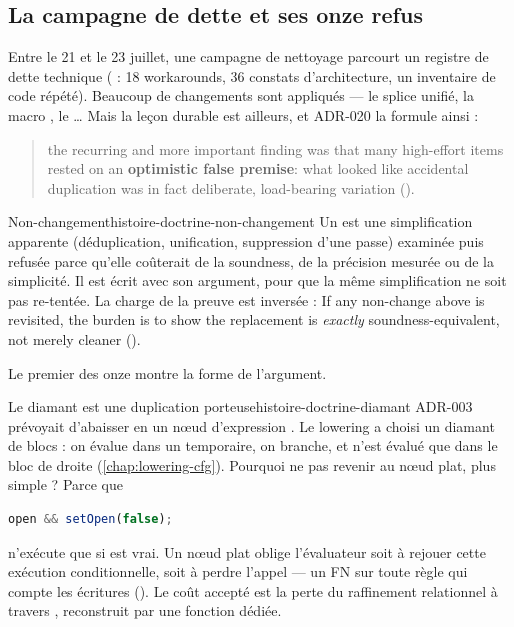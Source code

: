\subsection{La campagne de dette et ses onze refus}

Entre le 21 et le 23 juillet, une campagne de nettoyage parcourt un registre de dette technique ( : 18 workarounds, 36 constats d'architecture, un inventaire de code répété). Beaucoup de changements sont appliqués --- le splice unifié, la macro , le \dots{} Mais la leçon durable est ailleurs, et ADR-020 la formule ainsi :

\begin{quote}\small
\og the recurring and more important finding was that many high-effort items rested on an \textbf{optimistic false premise}: what looked like accidental duplication was in fact deliberate, load-bearing variation\fg{} ().
\end{quote}

\begin{definition}{Non-changement}{histoire-doctrine-non-changement}
Un  est une simplification apparente (déduplication, unification, suppression d'une passe) examinée puis refusée parce qu'elle coûterait de la soundness, de la précision mesurée ou de la simplicité. Il est écrit avec son argument, pour que la même simplification ne soit pas re-tentée. La charge de la preuve est inversée : \og If any non-change above is revisited, the burden is to show the replacement is \emph{exactly} soundness-equivalent, not merely cleaner\fg{} ().
\end{definition}

Le premier des onze montre la forme de l'argument.

\begin{exemple}{Le diamant \code{\&\&} est une duplication porteuse}{histoire-doctrine-diamant}
ADR-003 prévoyait d'abaisser  en un nœud d'expression . Le lowering a choisi un diamant de blocs : on évalue  dans un temporaire, on branche, et  n'est évalué que dans le bloc de droite (\cref{chap:lowering-cfg}). Pourquoi ne pas revenir au nœud plat, plus simple ? Parce que
\begin{lstlisting}[language=TypeScript]
open && setOpen(false);
\end{lstlisting}
n'exécute  que si  est vrai. Un nœud plat oblige l'évaluateur soit à rejouer cette exécution conditionnelle, soit à perdre l'appel --- un FN sur toute règle qui compte les écritures (). Le coût accepté est la perte du raffinement relationnel à travers \code{\&\&}, reconstruit par une fonction dédiée.
\end{exemple}

